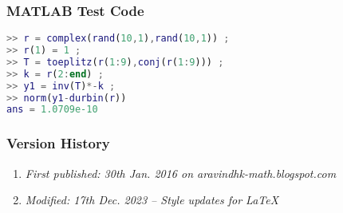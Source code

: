 \subsubsection{MATLAB Test Code}
\begin{lstlisting}[language=MATLAB,numbers=none]
>> r = complex(rand(10,1),rand(10,1)) ;
>> r(1) = 1 ;
>> T = toeplitz(r(1:9),conj(r(1:9))) ;
>> k = r(2:end) ;
>> y1 = inv(T)*-k ;
>> norm(y1-durbin(r))
ans = 1.0709e-10
\end{lstlisting}

\subsubsection{Version History}
\begin{enumerate}
	\item \emph{First published: 30th Jan. 2016 on aravindhk-math.blogspot.com}
	\item \emph{Modified: 17th Dec. 2023 -- Style updates for \LaTeX}
\end{enumerate}

